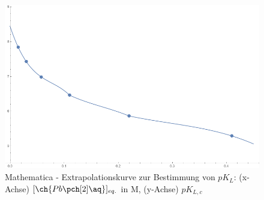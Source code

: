 \documentclass{article}
\begin{document}
    \begin{figure}[H]
      \includegraphics[scale=0.4, center]{Graphiken/Auswertung/ExtrapolationMathematica.png} 
      \caption[Extrapolationskurve zur Bestimmung von $pK_{L}$ mit Mathematica, Quelle: Autor]{Mathematica - Extrapolationskurve zur Bestimmung von $pK_{L}$: (x-Achse) $[\ch{Pb\pch[2]\aq}]_{eq.}$ in M, (y-Achse) $pK_{L,c}$}
      \label{fig:Extrapolationzwei}
    \end{figure}
    
  \pagebreak
  
  \listofreactions
  \printbibliography[title=Literaturverzeichnis]
  \listoffigures
  \listoftables
  
\end{document}
